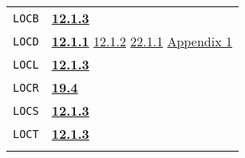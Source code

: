 \documentclass[a4paper,]{article}
\begin{document}
\begin{longtable}[]{@{}ll@{}}
\begin{minipage}[t]{0.24\columnwidth}\raggedright\strut
\texttt{LOCB}\strut
\end{minipage} & \begin{minipage}[t]{0.70\columnwidth}\raggedright\strut
\textbf{\href{12-locatives.md\#1213-at}{12.1.3}}\strut
\end{minipage}\tabularnewline
\begin{minipage}[t]{0.24\columnwidth}\raggedright\strut
\texttt{LOCD}\strut
\end{minipage} & \begin{minipage}[t]{0.70\columnwidth}\raggedright\strut
\textbf{\href{12-locatives.md\#1211-lloc}{12.1.1}} \href{12-locatives.md\#1212-gloc}{12.1.2}
\href{22-storage-management.md\#2211-stacks-and-other-internal-vectors}{22.1.1}
\href{appendix-1-a-look-inside.md\#appendix-1-a-look-inside}{Appendix 1}\strut
\end{minipage}\tabularnewline
\begin{minipage}[t]{0.24\columnwidth}\raggedright\strut
\texttt{LOCL}\strut
\end{minipage} & \begin{minipage}[t]{0.70\columnwidth}\raggedright\strut
\textbf{\href{12-locatives.md\#1213-at}{12.1.3}}\strut
\end{minipage}\tabularnewline
\begin{minipage}[t]{0.24\columnwidth}\raggedright\strut
\texttt{LOCR}\strut
\end{minipage} & \begin{minipage}[t]{0.70\columnwidth}\raggedright\strut
\textbf{\href{19-compiled-programs.md\#194-pure-and-impure-code}{19.4}}\strut
\end{minipage}\tabularnewline
\begin{minipage}[t]{0.24\columnwidth}\raggedright\strut
\texttt{LOCS}\strut
\end{minipage} & \begin{minipage}[t]{0.70\columnwidth}\raggedright\strut
\textbf{\href{12-locatives.md\#1213-at}{12.1.3}}\strut
\end{minipage}\tabularnewline
\begin{minipage}[t]{0.24\columnwidth}\raggedright\strut
\texttt{LOCT}\strut
\end{minipage} & \begin{minipage}[t]{0.70\columnwidth}\raggedright\strut
\textbf{\href{12-locatives.md\#1213-at}{12.1.3}}\strut
\end{minipage}\tabularnewline
\begin{minipage}[t]{0.24\columnwidth}\raggedright\strut

\end{minipage}
\end{longtable}
\end{document}

